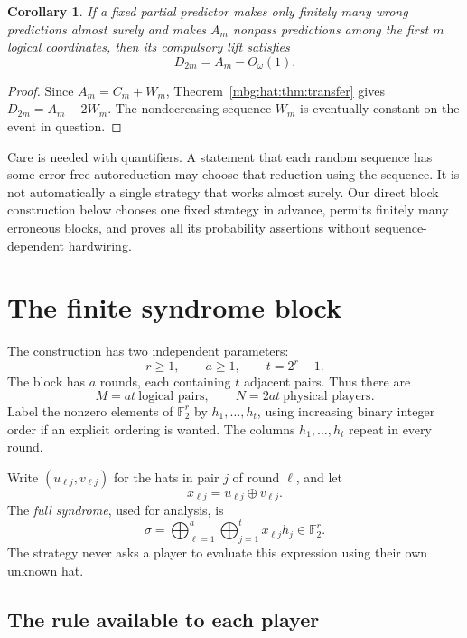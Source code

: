 \documentclass[11pt,letterpaper]{article}
\newtheorem{corollary}[theorem]{Corollary}
\theoremstyle{definition}
\newcommand{\F}{\mathbb F}
\newcommand{\xor}{\mathbin{\oplus}}
\begin{document}
\begin{corollary}\label{mbg:hat:cor:partial-density}
If a fixed partial predictor makes only finitely many wrong
predictions almost surely and makes \(A_m\) nonpass predictions among
the first \(m\) logical coordinates, then its compulsory lift satisfies
\[
  D_{2m}=A_m-O_\omega(1).
\]
\end{corollary}
\begin{proof}
Since \(A_m=C_m+W_m\), Theorem~\ref{mbg:hat:thm:transfer} gives
\(D_{2m}=A_m-2W_m\). The nondecreasing sequence \(W_m\) is eventually
constant on the event in question.
\end{proof}

Care is needed with quantifiers. A statement that each random sequence
has some error-free autoreduction may choose that reduction using the
sequence. It is not automatically a single strategy that works almost
surely. Our direct block construction below chooses one fixed strategy
in advance, permits finitely many erroneous blocks, and proves all its
probability assertions without sequence-dependent hardwiring.

\section{The finite syndrome block}
\label{mbg:hat:sec:block}

The construction has two independent parameters:
\[
  r\ge1,\qquad a\ge1,\qquad t=2^r-1.
\]
The block has \(a\) rounds, each containing \(t\) adjacent pairs.
Thus there are
\[
  M=at\ \text{logical pairs},\qquad N=2at\ \text{physical players}.
\]
Label the nonzero elements of \(\F_2^r\) by
\(h_1,\ldots,h_t\), using increasing binary integer order if an
explicit ordering is wanted. The columns \(h_1,\ldots,h_t\) repeat
in every round.

Write \((u_{\ell j},v_{\ell j})\) for the hats in pair \(j\) of
round \(\ell\), and let
\[
  x_{\ell j}=u_{\ell j}\xor v_{\ell j}.
\]
The \emph{full syndrome}, used for analysis, is
\[
  \sigma=\bigoplus_{\ell=1}^a\bigoplus_{j=1}^t
                    x_{\ell j}h_j\in\F_2^r.                 \tag{20.1}\label{mbg:hat:eq:syndrome}
\]
The strategy never asks a player to evaluate this expression using
their own unknown hat.

\subsection{The rule available to each player}
\end{document}

